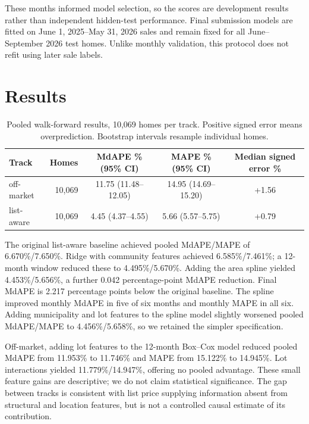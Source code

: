 \documentclass[11pt]{article}
\begin{document}
These months informed model selection, so the scores are development results rather than independent hidden-test performance. Final submission models are fitted on June 1, 2025--May 31, 2026 sales and remain fixed for all June--September 2026 test homes. Unlike monthly validation, this protocol does not refit using later sale labels.

\section{Results}
\begin{table}[h]
\centering
\begin{tabular}{lrccc}
\hline
Track & Homes & MdAPE \% (95\% CI) & MAPE \% (95\% CI) & Median signed error \% \\
\hline
off-market & 10,069 & 11.75 (11.48--12.05) & 14.95 (14.69--15.20) & +1.56 \\
list-aware & 10,069 & 4.45 (4.37--4.55) & 5.66 (5.57--5.75) & +0.79 \\
\hline
\end{tabular}
%
\caption{Pooled walk-forward results, 10,069 homes per track. Positive signed error means overprediction. Bootstrap intervals resample individual homes.}
\end{table}
The original list-aware baseline achieved pooled MdAPE/MAPE of 6.670\%/7.650\%. Ridge with community features achieved 6.585\%/7.461\%; a 12-month window reduced these to 4.495\%/5.670\%. Adding the area spline yielded 4.453\%/5.656\%, a further 0.042 percentage-point MdAPE reduction. Final MdAPE is 2.217 percentage points below the original baseline. The spline improved monthly MdAPE in five of six months and monthly MAPE in all six. Adding municipality and lot features to the spline model slightly worsened pooled MdAPE/MAPE to 4.456\%/5.658\%, so we retained the simpler specification.

Off-market, adding lot features to the 12-month Box--Cox model reduced pooled MdAPE from 11.953\% to 11.746\% and MAPE from 15.122\% to 14.945\%. Lot interactions yielded 11.779\%/14.947\%, offering no pooled advantage. These small feature gains are descriptive; we do not claim statistical significance. The gap between tracks is consistent with list price supplying information absent from structural and location features, but is not a controlled causal estimate of its contribution.
\end{document}
